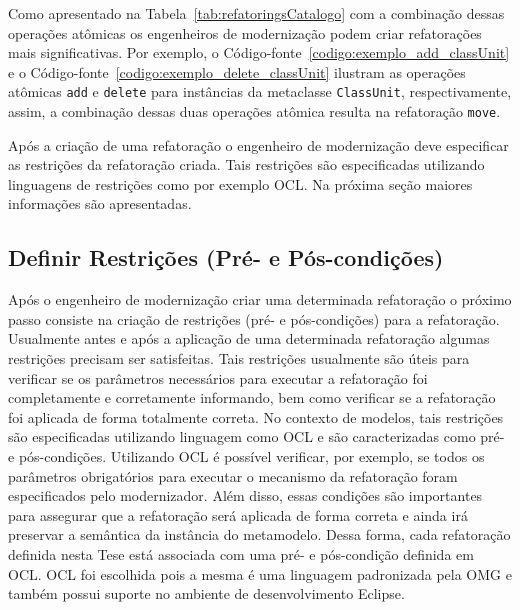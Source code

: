 Como apresentado na Tabela~\ref{tab:refatoringsCatalogo} com a combinação dessas operações atômicas os engenheiros de modernização podem criar refatorações mais significativas. Por exemplo, o Código-fonte~\ref{codigo:exemplo_add_classUnit} e o Código-fonte~\ref{codigo:exemplo_delete_classUnit} ilustram as operações atômicas \texttt{add} e \texttt{delete} para instâncias da metaclasse \texttt{ClassUnit}, respectivamente, assim, a combinação dessas duas operações atômica resulta na refatoração \texttt{move}. %

Após a criação de uma refatoração o engenheiro de modernização deve especificar as restrições da refatoração criada. Tais restrições são especificadas utilizando linguagens de restrições como por exemplo OCL. Na próxima seção maiores informações são apresentadas.

\subsection{Definir Restrições (Pré- e Pós-condições)}\label{sec:linguagem_de_restricao}

Após o engenheiro de modernização criar uma determinada refatoração o próximo passo consiste na criação de restrições (pré- e pós-condições) para a refatoração. Usualmente antes e após a aplicação de uma determinada refatoração algumas restrições precisam ser satisfeitas. Tais restrições usualmente são úteis para verificar se os parâmetros necessários para executar a refatoração foi completamente e corretamente informando, bem como verificar se a refatoração foi aplicada de forma totalmente correta. No contexto de modelos, tais restrições são especificadas utilizando linguagem como OCL e são caracterizadas como pré- e pós-condições. Utilizando OCL é possível verificar, por exemplo, se todos os parâmetros obrigatórios para executar o mecanismo da refatoração foram especificados pelo modernizador. Além disso, essas condições são importantes para assegurar que a refatoração será aplicada de forma correta e ainda irá preservar a semântica da instância do metamodelo. Dessa forma, cada refatoração definida nesta Tese está associada com uma pré- e pós-condição definida em OCL. OCL foi escolhida pois a mesma é uma linguagem padronizada pela OMG e também possui suporte no ambiente de desenvolvimento Eclipse.


